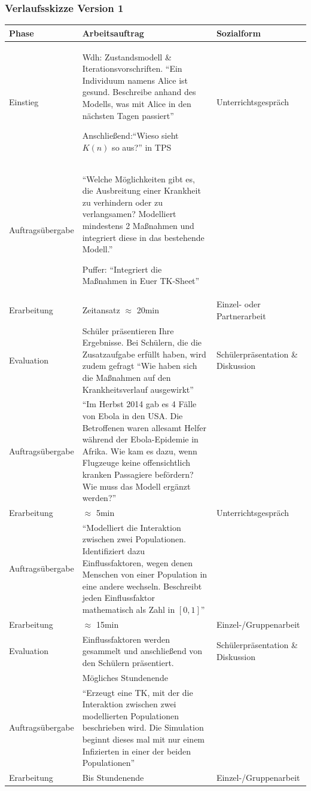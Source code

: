 \begin{landscape}
\subsubsection{Verlaufsskizze Version 1}
\noindent
\begin{longtable}{|C{0.3\textwidth}|L{0.8\textwidth}|L{0.4\textwidth}|}
\hline
Phase & Arbeitsauftrag & Sozialform\\
\hline\hline
\endhead
\hline
\endfoot
Einstieg& Wdh: Zustandsmodell \& Iterationsvorschriften. ``Ein Individuum namens Alice ist gesund. Beschreibe anhand des Modells, was mit Alice in den nächsten Tagen passiert''

Anschließend:``Wieso sieht $K(n)$ so aus?'' in TPS& Unterrichtsgespräch\\\hline
Auftragsübergabe&``Welche Möglichkeiten gibt es, die Ausbreitung einer Krankheit zu verhindern oder zu verlangsamen? Modelliert mindestens 2 Maßnahmen und integriert diese in das bestehende Modell.''

Puffer: ``Integriert die Maßnahmen in Euer TK-Sheet''&\\\hline
Erarbeitung&Zeitansatz $\approx$ 20min&Einzel- oder Partnerarbeit\\\hline
Evaluation&Schüler präsentieren Ihre Ergebnisse. Bei Schülern, die die Zusatzaufgabe erfüllt haben, wird zudem gefragt ``Wie haben sich die Maßnahmen auf den Krankheitsverlauf ausgewirkt''&Schülerpräsentation \& Diskussion\\\hline
Auftragsübergabe&``Im Herbst 2014 gab es 4 Fälle von Ebola in den USA. Die Betroffenen waren allesamt Helfer während der Ebola-Epidemie in Afrika. Wie kam es dazu, wenn Flugzeuge keine offensichtlich kranken Passagiere befördern? Wie muss das Modell ergänzt werden?''&\\\hline
Erarbeitung&$\approx$ 5min&Unterrichtsgespräch\\\hline
Auftragsübergabe&``Modelliert die Interaktion zwischen zwei Populationen. Identifiziert dazu Einflussfaktoren, wegen denen Menschen von einer Population in eine andere wechseln. Beschreibt jeden Einflussfaktor mathematisch als Zahl in $[0,1]$''&\\\hline
Erarbeitung&$\approx$ 15min&Einzel-/Gruppenarbeit\\\hline
Evaluation&Einflussfaktoren werden gesammelt und anschließend von den Schülern präsentiert.&Schülerpräsentation \& Diskussion\\\hline\hline
&Mögliches Stundenende&\\\hline\hline
Auftragsübergabe&``Erzeugt eine TK, mit der die Interaktion zwischen zwei modellierten Populationen beschrieben wird. Die Simulation beginnt dieses mal mit nur einem Infizierten in einer der beiden Populationen''&\\\hline
Erarbeitung&Bis Stundenende&Einzel-/Gruppenarbeit\\
\end{longtable}

\end{landscape}
